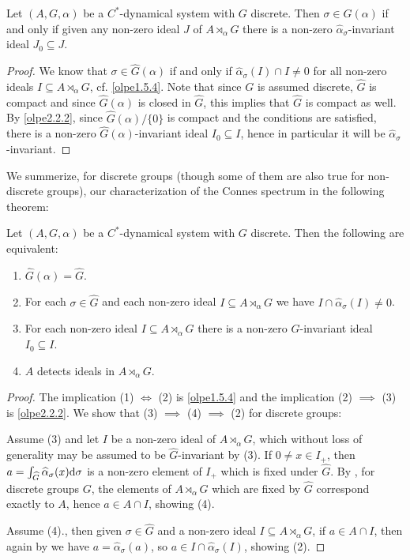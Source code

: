 \begin{proposition}
	Let $(A,G,\alpha)$ be a $C^*$-dynamical system with $G$ discrete. Then $\sigma \in \hat G(\alpha)$ if and only if given any non-zero ideal $J$ of $A \rtimes_\alpha G$ there is a non-zero $\hat \alpha_\sigma$-invariant ideal $J_0 \subseteq J$.
	\label{olpe2.2.4}
\end{proposition}
\begin{proof}
	We know that $\sigma \in \hat G(\alpha)$ if and only if $\hat \alpha_\sigma(I) \cap I \neq 0$ for all non-zero ideals $I\subseteq A \rtimes_\alpha G$, cf. \cref{olpe1.5.4}. Note that since $G$ is assumed discrete, $\hat G$ is compact and since $\hat G(\alpha)$ is closed in $\hat G$, this implies that $\hat G$ is compact as well. By \cref{olpe2.2.2}, since $\hat G(\alpha) /\{0\}$ is compact and the conditions are satisfied, there is a non-zero $\hat G(\alpha)$-invariant ideal $I_0\subseteq I$, hence in particular it will be $\hat \alpha_\sigma$-invariant. 
\end{proof}
We summerize, for discrete groups (though some of them are also true for non-discrete groups), our characterization of the Connes spectrum in the following theorem:
\begin{theorem}
	Let $(A,G,\alpha)$ be a $C^*$-dynamical system with $G$ discrete. Then the following are equivalent:
	\begin{enumerate}
		\item $\hat G(\alpha) = \hat G$.
		\item For each $\sigma \in \hat G$ and each non-zero ideal $I \subseteq A \rtimes_\alpha G$ we have $I \cap \hat \alpha_\sigma(I) \neq 0$.
		\item For each non-zero ideal $I \subseteq A \rtimes_\alpha G$ there is a non-zero $\hat G$-invariant ideal $I_0 \subseteq I$.
		\item $A$ detects ideals in $A \rtimes_\alpha G$.
	\end{enumerate}
	\label{olpe2.2.5}
\end{theorem}
\begin{proof}
	The implication (1) $\iff$ (2) is \cref{olpe1.5.4} and the implication (2) $\implies$ (3) is \cref{olpe2.2.2}. We show that (3) $\implies$ (4) $\implies$ (2) for discrete groups:

	Assume (3) and let $I$ be a non-zero ideal of $A \rtimes_\alpha G$, which without loss of generality may be assumed to be $\hat G$-invariant by (3). If $0 \neq x \in I_+$, then $a = \int_{\widehat{G}} \widehat{\alpha}_{\sigma}(x) \mathrm{d} \sigma$ is a non-zero element of $I_+$ which is fixed under $\hat G$. By \cite[lemma 3.2]{landstad1979towards}, for discrete groups $G$, the elements of $A \rtimes_\alpha G$ which are fixed by $\hat G$ correspond exactly to $A$, hence $a \in A \cap I$, showing (4).

	Assume (4)., then given $\sigma \in \hat G$ and a non-zero ideal $I \subseteq A \rtimes_\alpha G$, if $a \in A \cap I$, then again by \cite[lemma 3.2]{landstad1979towards} we have $a = \hat \alpha_\sigma(a)$, so $a \in I \cap \hat \alpha_\sigma(I)$, showing (2).
\end{proof}

